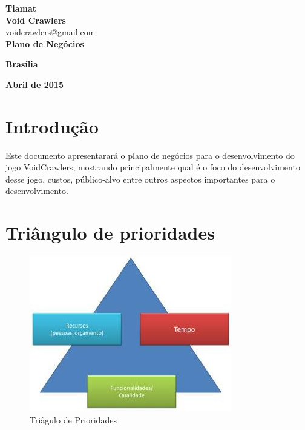 \documentclass[11pt]{article} %
\begin{document}
\begin{titlepage}
 \vfill
  \begin{center}
   {\large \textbf{Tiamat}} \\
   {\large \textbf{Void Crawlers}}\\
   {\large \url{voidcrawlers@gmail.com}}\\[6cm]


   {\Large \textbf{Plano de Negócios}}\\

   \hspace{.45\textwidth} %
  \vfill

\vspace{2cm}

\large \textbf{Brasília}

\large \textbf{Abril de 2015}
\end{center}
\end{titlepage}
\newpage

\tableofcontents

\newpage


\section{Introdução}

Este documento apresentarará o plano de negócios para o desenvolvimento do jogo VoidCrawlers, mostrando principalmente qual é o foco do desenvolvimento desse jogo, custos, público-alvo entre outros aspectos importantes para o desenvolvimento.

\section{Triângulo de prioridades}

\begin{figure}[!htp]
\centering
\includegraphics[scale=0.75]{pictures/restrictions_triangle.jpg}
\caption{Triâgulo de Prioridades}
\label{Prioridades}
\end{figure}
\end{document}
